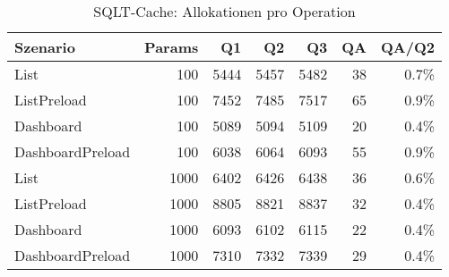 \begin{table}[ht]
\caption{SQLT-Cache: Allokationen pro Operation}
\begin{tabular}{lrrrrrr}
\toprule
Szenario & Params & Q1 & Q2 & Q3 & QA & QA/Q2 \\
\midrule
	List & 100 & 5444 & 5457 & 5482 & 38 & 0.7\% \\
	ListPreload & 100 & 7452 & 7485 & 7517 & 65 & 0.9\% \\
	Dashboard & 100 & 5089 & 5094 & 5109 & 20 & 0.4\% \\
	DashboardPreload & 100 & 6038 & 6064 & 6093 & 55 & 0.9\% \\
	List & 1000 & 6402 & 6426 & 6438 & 36 & 0.6\% \\
	ListPreload & 1000 & 8805 & 8821 & 8837 & 32 & 0.4\% \\
	Dashboard & 1000 & 6093 & 6102 & 6115 & 22 & 0.4\% \\
	DashboardPreload & 1000 & 7310 & 7332 & 7339 & 29 & 0.4\% \\
\bottomrule
\end{tabular}
\label{tab:benchmark_sqlt-cache_allocsperop}
\end{table}
	